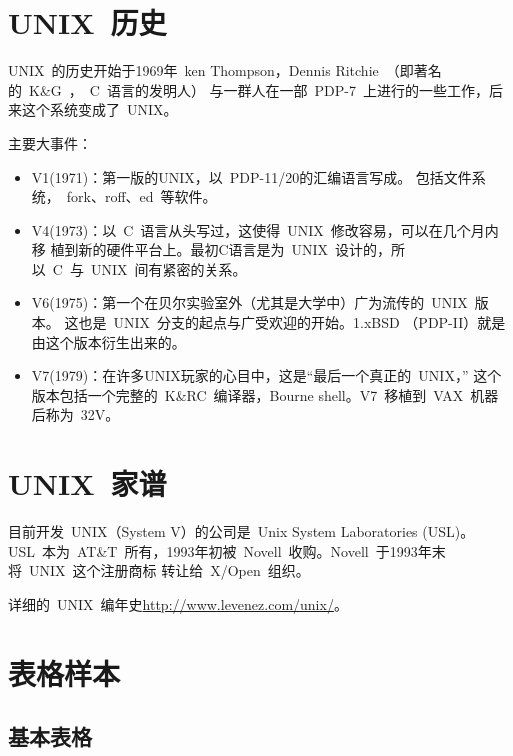 \documentclass[../Main/thesis.tex]{subfiles}
\begin{document}
\section{UNIX~历史}
\label{sec:history}
UNIX~的历史开始于1969年~ken Thompson，Dennis Ritchie~（即著名的~K\&G~，~C~语言的发明人）
与一群人在一部~PDP-7~上进行的一些工作，后来这个系统变成了~UNIX。\par
主要大事件：
\begin{itemize}
  \item V1(1971)：第一版的UNIX，以~PDP-11/20的汇编语言写成。
        包括文件系统，~fork、roff、ed~等软件。
  \item V4(1973)：以~C~语言从头写过，这使得~UNIX~修改容易，可以在几个月内移
        植到新的硬件平台上。最初C语言是为~UNIX~设计的，所以~C~与~UNIX~间有紧密的关系。
  \item V6(1975)：第一个在贝尔实验室外（尤其是大学中）广为流传的~UNIX~版本。
        这也是~UNIX~分支的起点与广受欢迎的开始。1.xBSD （PDP-II）就是由这个版本衍生出来的。
  \item V7(1979)：在许多UNIX玩家的心目中，这是“最后一个真正的~UNIX，”
        这个版本包括一个完整的~K\&RC~编译器，Bourne
        shell。V7~移植到~VAX~机器后称为~32V。
\end{itemize}
\section{UNIX~家谱}
目前开发~UNIX（System V）的公司是~Unix System Laboratories
(USL)。USL~本为~AT\&T~所有，1993年初被~Novell~收购。Novell~于1993年末将~UNIX~这个注册商标
转让给~X/Open~组织。

\label{sec:family}

详细的~UNIX~编年史\url{http://www.levenez.com/unix/}。

\section{表格样本}
\label{chap1:sample:table}

\subsection{基本表格}
\label{sec:basictable}
\end{document}
